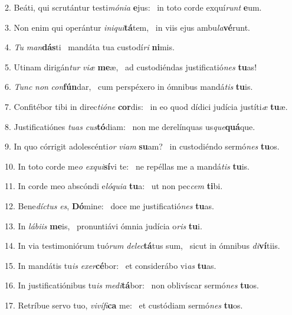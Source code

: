 2. Beáti, qui scrutántur testi\textit{mó}\textit{ni}\textit{a} \textbf{e}jus: \ast\  in toto corde exquí\textit{runt} \textbf{e}um.\

3. Non enim qui operántur \textit{in}\textit{i}\textit{qui}\textbf{tá}tem, \ast\  in viis ejus ambu\textit{la}\textbf{vé}runt.\

4. \textit{Tu} \textit{man}\textbf{dás}ti \ast\  mandáta tua custodí\textit{ri} \textbf{ni}mis.\

5. Utinam dirigán\textit{tur} \textit{vi}\textit{æ} \textbf{me}æ, \ast\  ad custodiéndas justificatió\textit{nes} \textbf{tu}as!\

6. \textit{Tunc} \textit{non} \textit{con}\textbf{fún}dar, \ast\  cum perspéxero in ómnibus mandá\textit{tis} \textbf{tu}is.\

7. Confitébor tibi in direc\textit{ti}\textit{ó}\textit{ne} \textbf{cor}dis: \ast\  in eo quod dídici judícia justíti\textit{æ} \textbf{tu}æ.\

8. Justificatiónes \textit{tu}\textit{as} \textit{cus}\textbf{tó}diam: \ast\  non me derelínquas us\textit{que}\textbf{quá}que.\

9. In quo córrigit adolescénti\textit{or} \textit{vi}\textit{am} \textbf{su}am? \ast\  in custodiéndo sermó\textit{nes} \textbf{tu}os.\

10. In toto corde me\textit{o} \textit{ex}\textit{qui}\textbf{sí}vi te: \ast\  ne repéllas me a mandá\textit{tis} \textbf{tu}is.\

11. In corde meo abscóndi e\textit{ló}\textit{qui}\textit{a} \textbf{tu}a: \ast\  ut non pec\textit{cem} \textbf{ti}bi.\

12. Bene\textit{díc}\textit{tus} \textit{es}, \textbf{Dó}mine: \ast\  doce me justificatió\textit{nes} \textbf{tu}as.\

13. In \textit{lá}\textit{bi}\textit{is} \textbf{me}is, \ast\  pronuntiávi ómnia judícia o\textit{ris} \textbf{tu}i.\

14. In via testimoniórum tuó\textit{rum} \textit{de}\textit{lec}\textbf{tá}tus sum, \ast\  sicut in ómnibus \textit{di}\textbf{ví}tiis.\

15. In mandátis tu\textit{is} \textit{ex}\textit{er}\textbf{cé}bor: \ast\  et considerábo vi\textit{as} \textbf{tu}as.\

16. In justificatiónibus tu\textit{is} \textit{me}\textit{di}\textbf{tá}bor: \ast\  non oblivíscar sermó\textit{nes} \textbf{tu}os.\

17. Retríbue servo tuo, \textit{vi}\textit{ví}\textit{fi}\textbf{ca} me: \ast\  et custódiam sermó\textit{nes} \textbf{tu}os.\

